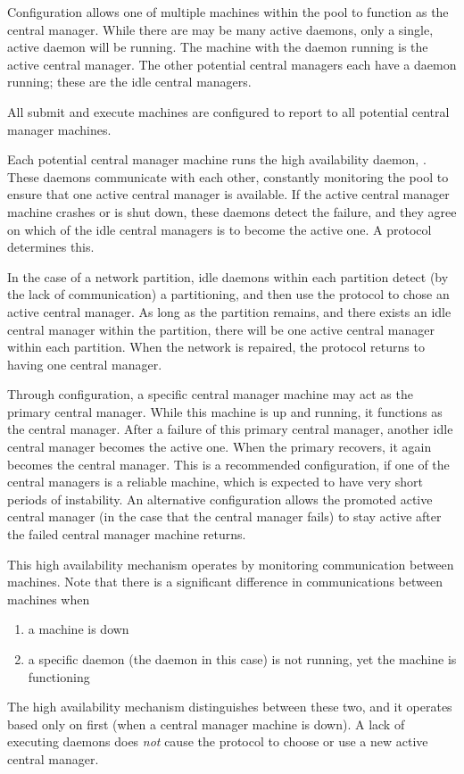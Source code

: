 Configuration allows one of
multiple machines within the pool to function as the central manager.
While there are may be many active  daemons,
only a single, active  daemon will be running.
The machine with the  daemon running is
the active central manager.
The other potential central managers each
have a  daemon running;
these are the idle central managers.

All submit and execute machines are configured to report
to all potential central manager machines.

Each potential central manager machine runs the high
availability daemon, .
These daemons communicate with each other,
constantly monitoring the pool to ensure that one active central
manager is available.
If the active central manager machine crashes or is shut down,
these daemons detect the failure,
and they agree on
which of the idle central managers is to become the active one.
A protocol determines this.

In the case of a network partition,
idle  daemons within each partition
detect (by the lack of communication) a partitioning,
and then use the protocol to chose an active central manager.
As long as the partition remains, 
and there exists an idle central manager within the partition,
there will be one active central manager within each partition.
When the network is repaired,
the protocol returns to having one central manager.

Through configuration,
a specific central manager machine may act as the
primary central manager.
While this machine is up and running, 
it functions as the central manager.
After a failure of this primary central manager,
another idle central manager becomes the active one.
When the primary recovers,
it again becomes the central manager.
This is a recommended configuration,
if one of the central managers is a reliable machine,
which is expected to have very short periods of instability.
An alternative configuration allows the promoted 
active central manager 
(in the case that the central manager fails)
to stay active after the failed central manager machine
returns.

This high availability mechanism operates by monitoring
communication between machines.
Note that there is a significant difference in
communications between machines when 
\begin{enumerate}
\item 
a machine is down
\item 
a specific daemon (the  daemon in this case)
is not running, yet the machine is functioning
\end{enumerate}
The high availability mechanism distinguishes between these two,
and it operates based only on first
(when a central manager machine is down).
A lack of executing daemons does \emph{not}
cause the protocol to choose or use a new active central manager. 

